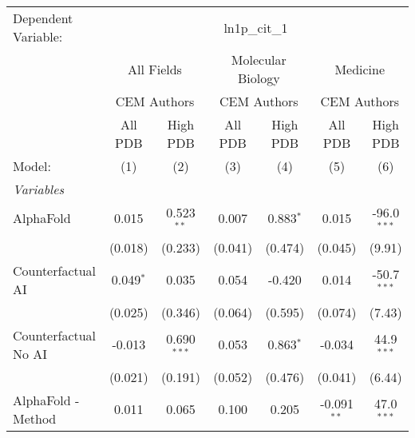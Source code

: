 \begingroup
\centering
\begin{tabular}{lcccccc}
   \tabularnewline \midrule \midrule
   Dependent Variable: & \multicolumn{6}{c}{ln1p\_cit\_1}\\
 & \multicolumn{2}{c}{All Fields} & \multicolumn{2}{c}{Molecular Biology} & \multicolumn{2}{c}{Medicine} \\
\cmidrule(lr){2-3} \cmidrule(lr){4-5} \cmidrule(lr){6-7}
 & \multicolumn{2}{c}{CEM Authors} & \multicolumn{2}{c}{CEM Authors} & \multicolumn{2}{c}{CEM Authors} \\
\cmidrule(lr){2-3} \cmidrule(lr){4-5} \cmidrule(lr){6-7}
 & \multicolumn{1}{c}{All PDB} & \multicolumn{1}{c}{High PDB} & \multicolumn{1}{c}{All PDB} & \multicolumn{1}{c}{High PDB} & \multicolumn{1}{c}{All PDB} & \multicolumn{1}{c}{High PDB} \\
\cmidrule(lr){2-2} \cmidrule(lr){3-3} \cmidrule(lr){4-4} \cmidrule(lr){5-5} \cmidrule(lr){6-6} \cmidrule(lr){7-7}
   Model:                                                     & (1)            & (2)           & (3)            & (4)         & (5)           & (6)\\  
   \midrule
   \emph{Variables}\\
   AlphaFold                                                  & 0.015          & 0.523$^{**}$  & 0.007          & 0.883$^{*}$ & 0.015         & -96.0$^{***}$\\   
                                                              & (0.018)        & (0.233)       & (0.041)        & (0.474)     & (0.045)       & (9.91)\\   
   Counterfactual AI                                          & 0.049$^{*}$    & 0.035         & 0.054          & -0.420      & 0.014         & -50.7$^{***}$\\   
                                                              & (0.025)        & (0.346)       & (0.064)        & (0.595)     & (0.074)       & (7.43)\\   
   Counterfactual No AI                                       & -0.013         & 0.690$^{***}$ & 0.053          & 0.863$^{*}$ & -0.034        & 44.9$^{***}$\\   
                                                              & (0.021)        & (0.191)       & (0.052)        & (0.476)     & (0.041)       & (6.44)\\   
   AlphaFold - Method                                         & 0.011          & 0.065         & 0.100          & 0.205       & -0.091$^{**}$ & 47.0$^{***}$\\   

\end{tabular}
